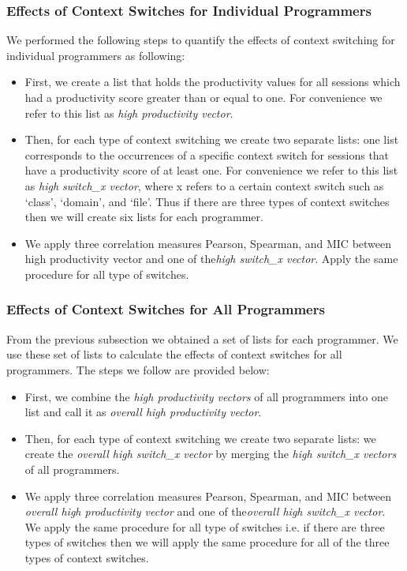 \subsubsection{Effects of Context Switches for Individual Programmers}
We performed the following steps to quantify the effects of context switching for 
individual programmers as following:
\begin{itemize}
\item{First, we create a list that holds the productivity values for all sessions
which had a productivity score greater than or equal to one. For convenience we refer to this list as \textit{high productivity vector}. }
\item{Then, for each type of context switching we create two separate lists: one list corresponds to the occurrences of a specific context switch for sessions that have a productivity score of at least one. For convenience we refer to this list as \textit{high switch\_x vector}, where x refers to a certain context switch such as `class', `domain', and `file'. Thus if there are three types of context switches then we will create six lists for each programmer.}
 
\item{We apply three correlation measures Pearson, Spearman, and MIC between high productivity vector and one of the\textit{high switch\_x vector}. Apply the same procedure for all type of switches.}

\end{itemize} 

\subsubsection{Effects of Context Switches for All Programmers}
From the previous subsection we obtained a set of lists 
for each programmer. We use these set of lists to calculate the effects of context switches for all programmers. The steps we follow are provided below:
\begin{itemize}
\item{First, we combine the \textit{high productivity vectors} of all programmers into one list and call it as \textit{overall high productivity vector}. }
\item{Then, for each type of context switching we create two separate lists: we create the \textit{overall high switch\_x vector} by merging the \textit{high switch\_x vectors} of all programmers. }
 
\item{We apply three correlation measures Pearson, Spearman, and MIC between \textit{overall high productivity vector} and one of the\textit{overall high switch\_x vector}. We apply  the same procedure for all type of switches i.e. if there are three types of switches then we will apply the same procedure for all of the three types of context switches.}

\end{itemize}

